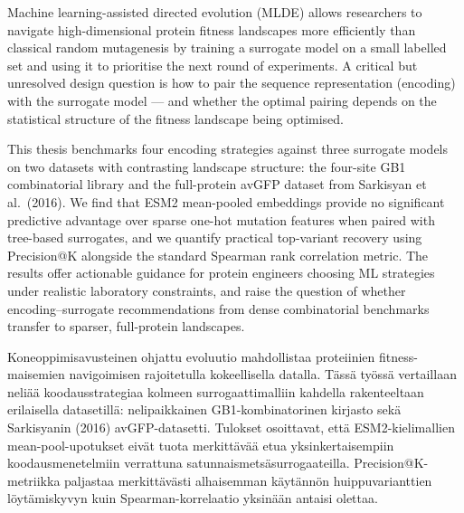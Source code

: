 \documentclass[english, 12pt, a4paper, elec, utf8, a-2b, online]{aaltothesis}
\date{\today}
\begin{document}
\makecoverpage
\makecopyrightpage
\clearpage

\begin{abstractpage}[english]
Machine learning-assisted directed evolution (MLDE) allows researchers to navigate high-dimensional
protein fitness landscapes more efficiently than classical random mutagenesis by training a
surrogate model on a small labelled set and using it to prioritise the next round of experiments.
A critical but unresolved design question is how to pair the sequence representation
(encoding) with the surrogate model --- and whether the optimal pairing depends on
the statistical structure of the fitness landscape being optimised.

This thesis benchmarks four encoding strategies against three surrogate models on two datasets
with contrasting landscape structure: the four-site GB1 combinatorial library and the full-protein
avGFP dataset from Sarkisyan et al.\ (2016).
We find that ESM2 mean-pooled embeddings provide no significant predictive advantage over sparse
one-hot mutation features when paired with tree-based surrogates, and we quantify practical
top-variant recovery using Precision@K alongside the standard Spearman rank correlation metric.
The results offer actionable guidance for protein engineers choosing ML strategies under
realistic laboratory constraints, and raise the question of whether encoding--surrogate recommendations
from dense combinatorial benchmarks transfer to sparser, full-protein landscapes.
\end{abstractpage}

\newpage
\begin{abstractpage}[finnish]
Koneoppimisavusteinen ohjattu evoluutio mahdollistaa proteiinien fitness-maisemien
navigoimisen rajoitetulla kokeellisella datalla.
T\"{a}ss\"{a} ty\"{o}ss\"{a} vertaillaan neli\"{a}\"{a} koodausstrategiaa kolmeen surrogaattimalliin
kahdella rakenteeltaan erilaisella datasetill\"{a}: nelipaikkainen GB1-kombinatorinen kirjasto
sek\"{a} Sarkisyanin (2016) avGFP-datasetti.
Tulokset osoittavat, ett\"{a} ESM2-kielimallien mean-pool-upotukset eiv\"{a}t tuota merkitt\"{a}v\"{a}\"{a}
etua yksinkertaisempiin koodausmenetelmiin verrattuna satunnaismets\"{a}surrogaateilla.
Precision@K-metriikka paljastaa merkitt\"{a}v\"{a}sti alhaisemman k\"{a}yt\"{a}nn\"{o}n
huippuvarianttien l\"{o}yt\"{a}miskyvyn kuin Spearman-korrelaatio yksin\"{a}\"{a}n antaisi olettaa.
\end{abstractpage}
\end{document}
